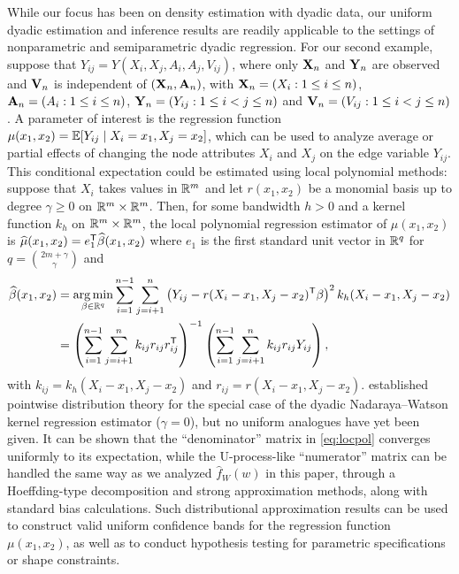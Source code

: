 While our focus has been on density estimation with dyadic data,
our uniform dyadic estimation and inference results are readily
applicable to the settings of nonparametric
and semiparametric dyadic regression.
For our second example, suppose that $Y_{ij} = Y(X_i, X_j, A_i, A_j, V_{ij})$,
where only $\mathbf{X}_n$ and $\mathbf{Y}_n$ are observed and
$\mathbf{V}_n$ is independent of $(\mathbf{X}_n, \mathbf{A}_n)$,
with $\mathbf{X}_n = (X_i : 1 \leq i \leq n)$,
$\mathbf{A}_n = (A_i : 1 \leq i \leq n)$,
$\mathbf{Y}_n = (Y_{ij}:1\leq i<j\leq n)$
and $\mathbf{V}_n = (V_{ij} : 1 \leq i < j \leq n)$.
A parameter of interest is the regression function
$\mu(x_1, x_2) = \mathbb{E}[Y_{ij} \mid X_i=x_1, X_j=x_2]$,
which can be used to analyze average or partial effects
of changing the node attributes $X_i$ and $X_j$
on the edge variable $Y_{ij}$.
This conditional expectation could be estimated
using local polynomial methods:
suppose that $X_i$ takes values in $\mathbb{R}^m$ and
let $r(x_1, x_2)$ be a monomial basis up to degree
$\gamma \geq 0$ on $\mathbb{R}^m \times \mathbb{R}^m$. Then,
for some bandwidth $h > 0$ and
a kernel function $k_h$ on $\mathbb{R}^m \times \mathbb{R}^m$,
the local polynomial regression estimator of
$\mu(x_1, x_2)$ is
$\widehat\mu(x_1, x_2)
= e_1^{\mathsf{T}} \widehat\beta(x_1, x_2)$ where
$e_1$ is the first standard
unit vector in $\mathbb{R}^q$ for $q=\binom{2m+\gamma}{\gamma}$ and
\begin{align}
  \nonumber
  \widehat{\beta}(x_1, x_2)
  &=
  \operatorname*{arg\,min}_{\beta \in \mathbb{R}^q}
  \sum_{i=1}^{n-1}
  \sum_{j=i+1}^n
  \left(
    Y_{ij} - r(X_i-x_1, X_j-x_2)^{\mathsf{T}} \beta
  \right)^2
  k_h(X_i-x_1, X_j-x_2) \\
  \label{eq:locpol}
  &=
  \left(
    \sum_{i=1}^{n-1}
    \sum_{j=i+1}^n
    k_{ij} r_{ij} r_{ij}^{\mathsf{T}}
  \right)^{-1}
  \left(
    \sum_{i=1}^{n-1}
    \sum_{j=i+1}^n
    k_{ij} r_{ij} Y_{ij}
  \right),
\end{align}
with $k_{ij} = k_h(X_i-x_1, X_j-x_2)$
and
$r_{ij} = r(X_i-x_1, X_j-x_2)$.
\citet{graham2021dyadicregression}
established pointwise distribution theory
for the special case of the dyadic Nadaraya--Watson
kernel regression estimator ($\gamma=0$), but no uniform analogues
have yet been given.
It can be shown that the
``denominator'' matrix
in \eqref{eq:locpol} converges uniformly
to its expectation,
while the U-process-like ``numerator'' matrix
can be handled the same way as we analyzed
$\widehat f_W(w)$ in this paper,
through a Hoeffding-type decomposition and
strong approximation methods,
along with standard bias calculations.
Such distributional approximation results can be used to construct valid
uniform confidence bands for the regression
function $\mu(x_1, x_2)$,
as well as to conduct hypothesis testing for
parametric specifications or shape constraints.

